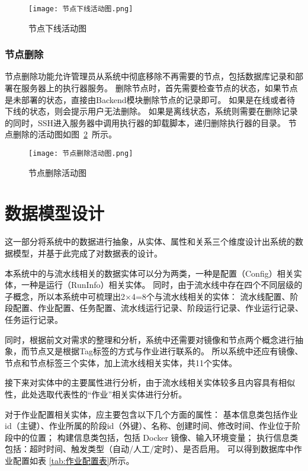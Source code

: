 \begin{figure}[h]
  \centering
  \texttt{[image: 节点下线活动图.png]}
  \caption{节点下线活动图}
  \label{fig:节点下线活动图}
\end{figure}

\subsubsection{节点删除}
节点删除功能允许管理员从系统中彻底移除不再需要的节点，包括数据库记录和部署在服务器上的执行器服务。
删除节点时，首先需要检查节点的状态，如果节点是未部署的状态，直接由Backend模块删除节点的记录即可。
如果是在线或者待下线的状态，则会提示用户无法删除。
如果是离线状态，系统则需要在删除记录的同时，SSH进入服务器中调用执行器的卸载脚本，递归删除执行器的目录。
节点删除的活动图如图~\ref{fig:节点删除活动图}~所示。

\begin{figure}[h]
  \centering
  \texttt{[image: 节点删除活动图.png]}
  \caption{节点删除活动图}
  \label{fig:节点删除活动图}
\end{figure}

\section{数据模型设计}
这一部分将系统中的数据进行抽象，从实体、属性和关系三个维度设计出系统的数据模型，并基于此完成了对数据表的设计。

本系统中的与流水线相关的数据实体可以分为两类，一种是配置（Config）相关实体，一种是运行（RunInfo）相关实体。
同时，由于流水线中存在四个不同层级的子概念，所以本系统中可梳理出2×4=8个与流水线相关的实体：
流水线配置、阶段配置、作业配置、任务配置、流水线运行记录、阶段运行记录、作业运行记录、任务运行记录。

同时，根据前文对需求的整理和分析，系统中还需要对镜像和节点两个概念进行抽象，而节点又是根据Tag标签的方式与作业进行联系的。
所以系统中还应有镜像、节点和节点标签三个实体，加上流水线相关实体，共11个实体。

接下来对实体中的主要属性进行分析，由于流水线相关实体较多且内容具有相似性，此处选取代表性的“作业”相关实体进行分析。

对于作业配置相关实体，应主要包含以下几个方面的属性：
基本信息类包括作业id（主键）、作业所属的阶段id（外键）、名称、创建时间、修改时间、作业位于阶段中的位置；
构建信息类包括，包括 Docker 镜像、输入环境变量；
执行信息类包括：超时时间、触发类型（自动/人工/定时）、是否启用。
可以得到数据库中作业配置如表 \ref{tab:作业配置表}所示。

